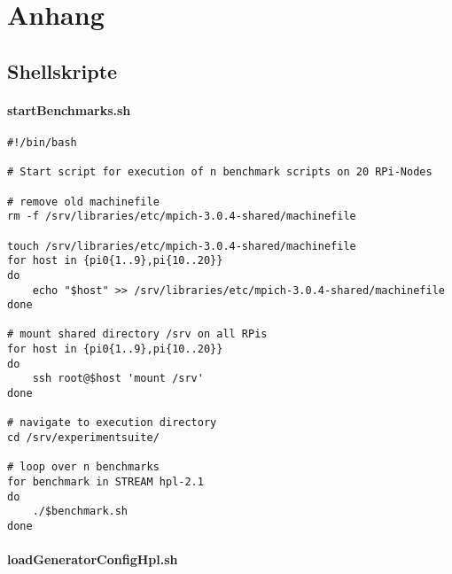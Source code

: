 \chapter{Anhang}\label{Anhang}

\section{Shellskripte}\label{skripte}

\subsubsection{startBenchmarks.sh}

\begin{verbatim}
#!/bin/bash

# Start script for execution of n benchmark scripts on 20 RPi-Nodes

# remove old machinefile
rm -f /srv/libraries/etc/mpich-3.0.4-shared/machinefile

touch /srv/libraries/etc/mpich-3.0.4-shared/machinefile
for host in {pi0{1..9},pi{10..20}}
do 
	echo "$host" >> /srv/libraries/etc/mpich-3.0.4-shared/machinefile
done 

# mount shared directory /srv on all RPis
for host in {pi0{1..9},pi{10..20}}
do 
	ssh root@$host 'mount /srv'
done

# navigate to execution directory
cd /srv/experimentsuite/ 

# loop over n benchmarks 
for benchmark in STREAM hpl-2.1
do 
	./$benchmark.sh  
done 
\end{verbatim}

\subsubsection{loadGeneratorConfigHpl.sh}

